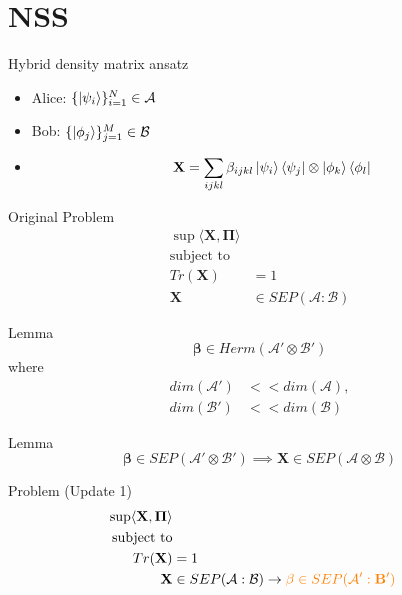 \documentclass{beamer}
\begin{document}
    \section{NSS}
        \begin{frame}{Hybrid density matrix ansatz}
            \begin{itemize}
                \item[] Alice: $\{\ket{\psi_{i}}\}_{i=1}^{N} \in \mathcal{A}$
                \item[] Bob: $\{\ket{\phi_{j}}\}_{j=1}^{M} \in \mathcal{B}$
                \item[]
                $$
                    \mathbf{X} = \sum\limits_{ijkl}\beta_{ijkl}\ket{\psi_{i}}\bra{\psi_{j}}\otimes\ket{\phi_{k}}\bra{\phi_{l}}
                $$
            \end{itemize}
        \end{frame}
        
        \begin{frame}{Original Problem}
            \begin{align*}
                \sup\langle\mathbf{X}, \mathbf{\Pi}\rangle \\
                \mbox{subject to} \\
                Tr(\mathbf{X}) &= 1 \\
                \mathbf{X} &\in SEP(\mathcal{A}:\mathcal{B})
            \end{align*}
        \end{frame}

        \begin{frame}{Lemma}
            $$
                \mathbf{\beta} \in Herm(\mathcal{A}' \otimes \mathcal{B}')
            $$
            where
            \begin{align*}
                dim(\mathcal{A}') &<< dim(\mathcal{A}), \\
                dim(\mathcal{B}') &<< dim(\mathcal{B})
            \end{align*}
            \pause
            \begin{block}{Lemma}
                $$
                    \mathbf{\beta} \in SEP(\mathcal{A}' \otimes \mathcal{B}') \implies \mathbf{X} \in SEP(\mathcal{A} \otimes \mathcal{B})
                $$
            \end{block}
        \end{frame}

        \begin{frame}{Problem (Update 1)}
            \begin{align*}
                \sup\langle\mathbf{X}, \mathbf{\Pi}\rangle \\
                \mbox{subject to} \\
                Tr(\mathbf{X}) &= 1 \\
                \mathbf{X} &\in SEP(\mathcal{A}:\mathcal{B}) \rightarrow \textcolor{orange}{\mathbf{\beta} \in SEP(\mathcal{A}':\mathbf{B}')}
            \end{align*}
        \end{frame}
\end{document}
